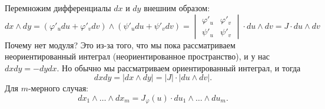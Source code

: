 Перемножим дифференциалы $dx$ и $dy$ внешним образом:
\begin{equation*}
    dx \wedge dy = (\varphi'_u du + \varphi'_v dv) \wedge (\psi'_u du + \psi'_v dv) = \begin{vmatrix}
        \varphi'_u & \varphi'_v \\
        \psi'_u & \psi'_v
    \end{vmatrix} \cdot du \wedge dv = J \cdot du \wedge dv
\end{equation*}
Почему нет модуля? Это из-за того, что мы пока рассматриваем неориентированный интеграл (неориентированное пространство), и у нас $dxdy = -dydx$. Но обычно мы рассматриваем ориентированный интеграл, и тогда 
\begin{equation*}
    dxdy = |dx \wedge dy| = |J| \cdot |du \wedge dv|.
\end{equation*}
Для $m$-мерного случая:
\begin{equation*}
    dx_1 \wedge \dots \wedge dx_m = J_\varphi(u) \cdot du_1 \wedge \dots \wedge du_m.
\end{equation*}